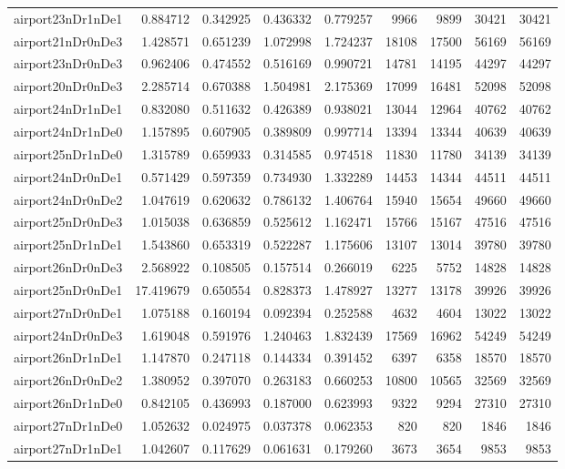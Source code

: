 \begin{longtable}{|l|r|r|r|r|r|r|r|r|}
airport23nDr1nDe1 & 0.884712 & 0.342925 & 0.436332 & 0.779257 & 9966 & 9899 & 30421 & 30421 \\
airport21nDr0nDe3 & 1.428571 & 0.651239 & 1.072998 & 1.724237 & 18108 & 17500 & 56169 & 56169 \\
airport23nDr0nDe3 & 0.962406 & 0.474552 & 0.516169 & 0.990721 & 14781 & 14195 & 44297 & 44297 \\
airport20nDr0nDe3 & 2.285714 & 0.670388 & 1.504981 & 2.175369 & 17099 & 16481 & 52098 & 52098 \\
airport24nDr1nDe1 & 0.832080 & 0.511632 & 0.426389 & 0.938021 & 13044 & 12964 & 40762 & 40762 \\
airport24nDr1nDe0 & 1.157895 & 0.607905 & 0.389809 & 0.997714 & 13394 & 13344 & 40639 & 40639 \\
airport25nDr1nDe0 & 1.315789 & 0.659933 & 0.314585 & 0.974518 & 11830 & 11780 & 34139 & 34139 \\
airport24nDr0nDe1 & 0.571429 & 0.597359 & 0.734930 & 1.332289 & 14453 & 14344 & 44511 & 44511 \\
airport24nDr0nDe2 & 1.047619 & 0.620632 & 0.786132 & 1.406764 & 15940 & 15654 & 49660 & 49660 \\
airport25nDr0nDe3 & 1.015038 & 0.636859 & 0.525612 & 1.162471 & 15766 & 15167 & 47516 & 47516 \\
airport25nDr1nDe1 & 1.543860 & 0.653319 & 0.522287 & 1.175606 & 13107 & 13014 & 39780 & 39780 \\
airport26nDr0nDe3 & 2.568922 & 0.108505 & 0.157514 & 0.266019 & 6225 & 5752 & 14828 & 14828 \\
airport25nDr0nDe1 & 17.419679 & 0.650554 & 0.828373 & 1.478927 & 13277 & 13178 & 39926 & 39926 \\
airport27nDr0nDe1 & 1.075188 & 0.160194 & 0.092394 & 0.252588 & 4632 & 4604 & 13022 & 13022 \\
airport24nDr0nDe3 & 1.619048 & 0.591976 & 1.240463 & 1.832439 & 17569 & 16962 & 54249 & 54249 \\
airport26nDr1nDe1 & 1.147870 & 0.247118 & 0.144334 & 0.391452 & 6397 & 6358 & 18570 & 18570 \\
airport26nDr0nDe2 & 1.380952 & 0.397070 & 0.263183 & 0.660253 & 10800 & 10565 & 32569 & 32569 \\
airport26nDr1nDe0 & 0.842105 & 0.436993 & 0.187000 & 0.623993 & 9322 & 9294 & 27310 & 27310 \\
airport27nDr1nDe0 & 1.052632 & 0.024975 & 0.037378 & 0.062353 & 820 & 820 & 1846 & 1846 \\
airport27nDr1nDe1 & 1.042607 & 0.117629 & 0.061631 & 0.179260 & 3673 & 3654 & 9853 & 9853 \\

\end{longtable}
